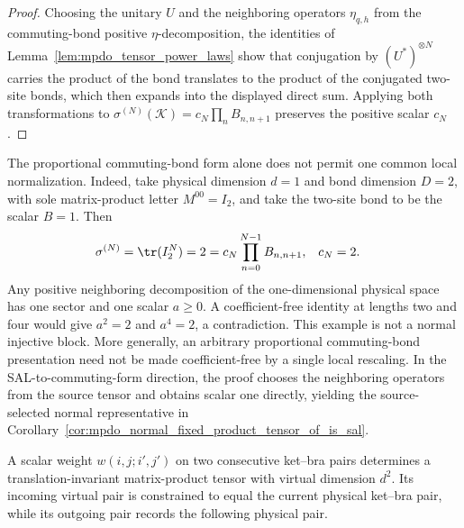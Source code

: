 \begin{proof}\leanok
    Choosing the unitary $U$ and the neighboring operators $\eta_{q,h}$ from
    the commuting-bond positive $\eta$-decomposition, the identities of
    Lemma~\ref{lem:mpdo_tensor_power_laws} show that conjugation by
    $(U^*)^{\otimes N}$ carries the product of the bond translates to the
    product of the conjugated two-site bonds, which then expands into the
    displayed direct sum. Applying both transformations to
    $\sigma^{(N)}(\mathcal K)=c_N\prod_n B_{n,n+1}$ preserves the
    positive scalar $c_N$.
\end{proof}

\begin{remark}
    The proportional commuting-bond form alone does not permit one common
    local normalization. Indeed, take physical dimension $d=1$ and bond
    dimension $D=2$, with sole matrix-product letter $M^{00}=I_2$, and take
    the two-site bond to be the scalar $B=1$. Then
    \begin{align}
        \sigma^{(N)}
         & =\tr(I_2^N)=2
        =c_N\prod_{n=0}^{N-1}B_{n,n+1},
         & c_N           & =2.
        \notag
    \end{align}
    Any positive neighboring decomposition of the one-dimensional physical
    space has one sector and one scalar $a\ge0$. A coefficient-free identity
    at lengths two and four would give $a^2=2$ and $a^4=2$, a contradiction.
    This example is not a normal injective block. More generally, an arbitrary
    proportional commuting-bond presentation need not be made coefficient-free
    by a single local rescaling. In the SAL-to-commuting-form direction, the proof
    chooses the neighboring operators from the source tensor and obtains scalar one
    directly, yielding the source-selected normal representative in
    Corollary~\ref{cor:mpdo_normal_fixed_product_tensor_of_is_sal}.
\end{remark}

\begin{definition}
    \label{def:mpdo_cyclic_edge_weight_tensor}
    \leanok
    A scalar weight $w(i,j;i',j')$ on two consecutive ket--bra pairs
    determines a translation-invariant matrix-product tensor with virtual
    dimension $d^2$. Its incoming virtual pair is constrained to equal the
    current physical ket--bra pair, while its outgoing pair records the
    following physical pair.
\end{definition}

